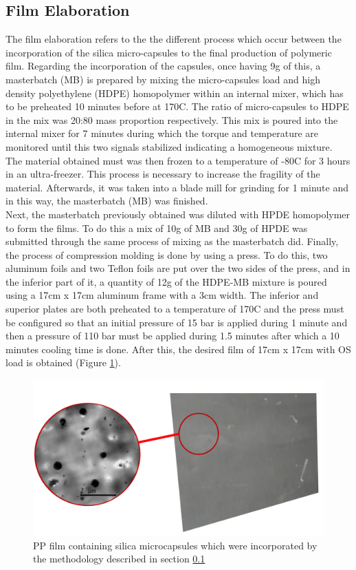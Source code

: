 \begin{refsection}
\subsection{Film Elaboration} \label{sec:film_elaboration}
The film elaboration refers to the the different process which occur between the incorporation of the silica micro-capsules to the final production of polymeric film. Regarding the incorporation of the capsules, once having 9g of this, a masterbatch (MB) is prepared by mixing the micro-capsules load and high density polyethylene (HDPE) homopolymer within an internal mixer, which has to be preheated 10 minutes before at 170\degree C. The ratio of  micro-capsules to HDPE in the mix was 20:80 mass proportion respectively. This mix is poured into the internal mixer for 7 minutes during which the torque and temperature are monitored until this two signals stabilized indicating a homogeneous mixture. The material obtained must was then frozen to a temperature of -80\degree C for 3 hours in an ultra-freezer. This process is necessary to increase the fragility of the material. Afterwards, it was taken into a blade mill for grinding for 1 minute and in this way, the masterbatch (MB) was finished. \\

Next, the masterbatch previously obtained was diluted with HPDE homopolymer to form the films. To do this a mix of 10g of MB and 30g of HPDE was submitted through the same process of mixing as the masterbatch did. Finally, the process of compression molding is done by using a press. To do this, two aluminum foils and two Teflon foils are put over the two sides of the press, and in the inferior part of it, a quantity of 12g of the HDPE-MB mixture is poured using a 17cm x 17cm aluminum frame with a 3cm width. The inferior and superior plates are both preheated to a temperature of 170\degree C and the press must be configured so that an initial pressure of 15 bar is applied during 1 minute and then a pressure of 110 bar must be applied during 1.5 minutes after which a 10 minutes cooling time is done. After this, the desired film of 17cm x 17cm with OS load is obtained (Figure \ref{fig:film}).

\begin{figure}[ht]
    \centering
    \includegraphics[width=0.6\linewidth]{Documento_Latex/Imagenes/pelicula.png}
    \caption{PP film containing silica microcapsules which were incorporated by the methodology described in section \ref{sec:film_elaboration} \cite{ArellanoAyala2019EfectosAntioxidantes}}
    \label{fig:film}
\end{figure}




\end{refsection}